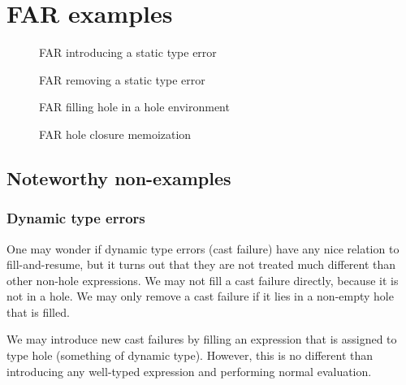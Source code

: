 \section{FAR examples}
\label{sec:far-examples}


\begin{figure}
  \centering
  \caption{FAR introducing a static type error}
  \label{fig:far-introduce-type-error}
\end{figure}

\begin{figure}
  \centering
  \caption{FAR removing a static type error}
  \label{fig:far-remove-type-error}
\end{figure}

\begin{figure}
  \centering
  \caption{FAR filling hole in a hole environment}
  \label{fig:far-fill-hole-in-hole-env}
\end{figure}

\begin{figure}
  \centering
  \caption{FAR hole closure memoization}
  \label{fig:far-hole-closure-memoization}
\end{figure}

\subsection{Noteworthy non-examples}
\label{sec:far-nonexamples}

\subsubsection{Dynamic type errors}
\label{sec:far-dynamic-type-errors}

One may wonder if dynamic type errors (cast failure) have any nice relation to fill-and-resume, but it turns out that they are not treated much different than other non-hole expressions. We may not fill a cast failure directly, because it is not in a hole. We may only remove a cast failure if it lies in a non-empty hole that is filled.

We may introduce new cast failures by filling an expression that is assigned to type hole (something of dynamic type). However, this is no different than introducing any well-typed expression and performing normal evaluation.

